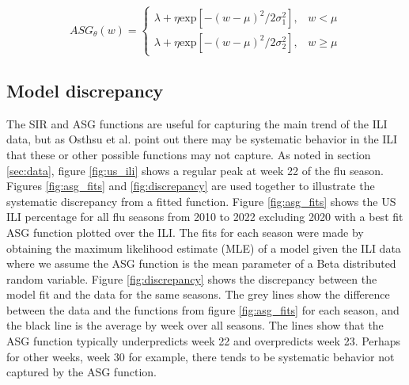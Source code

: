 \begin{equation}
    \label{eq:asg_function_rep}
    ASG_{\theta}(w) = 
    \begin{cases}
        \lambda + \eta \text{exp}[-(w - \mu)^2/2\sigma^2_1], \;\;\; w < \mu \\
        \lambda + \eta \text{exp}[-(w - \mu)^2/2\sigma^2_2], \;\;\; w \geq \mu
    \end{cases}
\end{equation}



\subsection{Model discrepancy}


The SIR and ASG functions are useful for capturing the main trend of the ILI 
data, but as Osthsu et al. \cite[]{osthus2019dynamic} point out there may be 
systematic behavior in the ILI that these or other possible functions may not 
capture. As noted in section \ref{sec:data}, figure \ref{fig:us_ili} shows a 
regular peak at week 22 of the flu season. 
Figures \ref{fig:asg_fits} and \ref{fig:discrepancy} are used together to 
illustrate the systematic discrepancy from a fitted function. Figure 
\ref{fig:asg_fits} shows the US ILI percentage for all flu seasons from 2010 
to 2022 excluding 2020 with a best fit ASG function plotted over the ILI. The 
fits for each season were made by obtaining the maximum likelihood estimate 
(MLE) of a model given the ILI data where we assume the ASG function is the 
mean parameter of a Beta distributed random variable. Figure 
\ref{fig:discrepancy} shows the discrepancy between the model fit and the data 
for the same seasons. The grey lines show the difference between the data and 
the functions from figure \ref{fig:asg_fits} for each season, and the black 
line is the average by week over all seasons. The lines show that the ASG 
function typically underpredicts week 22 and overpredicts week 23. Perhaps 
for other weeks, week 30 for example, there tends to be systematic 
behavior not captured by the ASG function.


